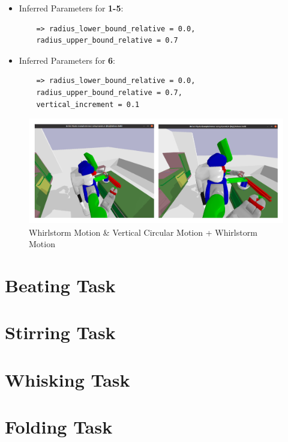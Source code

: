 \begin{itemize}
  \item Inferred Parameters for \textbf{1-5}: 
   \begin{lstlisting}
    => radius_lower_bound_relative = 0.0, 
    radius_upper_bound_relative = 0.7
  \end{lstlisting}
  \item Inferred Parameters for \textbf{6}:
  \begin{lstlisting}
    => radius_lower_bound_relative = 0.0, 
    radius_upper_bound_relative = 0.7,
    vertical_increment = 0.1
  \end{lstlisting}
\end{itemize}

\begin{figure}[H]
  \includegraphics[scale=0.26]{Graphics/mixingtask_rahmen.jpg}
  \caption{Whirlstorm Motion \& Vertical Circular Motion + Whirlstorm Motion}
  \label{fig:mixingverb WikiHow}
\end{figure}

\section{Beating Task}

\section{Stirring Task}

\section{Whisking Task}

\section{Folding Task}